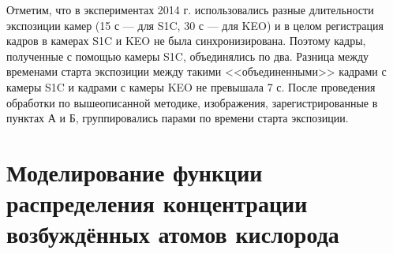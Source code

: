 \documentclass[12pt,a4paper]{article}
\begin{document}
Отметим, что в экспериментах 2014 г. использовались разные длительности экспозиции камер (15 с --- для S1C, 30 с --- для KEO) и в целом регистрация кадров в камерах S1C и KEO не была синхронизирована. Поэтому кадры, полученные с помощью камеры S1C, объединялись по два. Разница между временами старта экспозиции между такими <<объединенными>> кадрами с камеры S1C и кадрами с камеры KEO не превышала 7 с. После проведения обработки по вышеописанной методике, изображения, зарегистрированные в пунктах А и Б, группировались парами по времени старта экспозиции.


\section{Моделирование функции распределения концентрации возбуждённых атомов кислорода} \label{sec:modelling}
 
\end{document}
